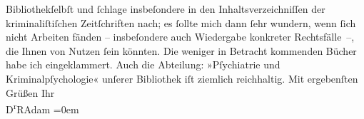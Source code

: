 \begin{ledgroupsized}[t]{13cm}
                  Bibliothekſelbſt und ſchlage insbeſondere in den
               Inhaltsverzeichniſſen der kriminaliſtiſchen Zeitſchriften nach; es ſollte mich dann
               ſehr wundern, wenn ſich nicht Arbeiten fänden – insbeſondere auch Wiedergabe
               konkreter Rechtsfälle –, die Ihnen von Nutzen ſein könnten.\pend
           \pstart
           Die weniger in Betracht kommenden Bücher habe ich eingeklammert.\pend
           \pstart
           Auch die Abteilung: »Pſychiatrie und Kriminalpſychologie« unſerer Bibliothek iſt ziemlich reichhaltig.\pend
           \pstart
           Mit ergebenſten Grüßen\pend
           \pstart
           Ihr{\\[\baselineskip]}\spacefill\mbox{D\textsuperscript{r}RAdam}\pend
           \leftskip=0em{}
         
         \endnumbering{}\end{ledgroupsized}  \newcommand{\dateiname}{L02294}\newcommand{\titel}{Robert Adam an Arthur Schnitzler, 10. 8. 1918}\newcommand{\editorInnen}{Martin Anton Müller und Gerd-Hermann Susen}
      